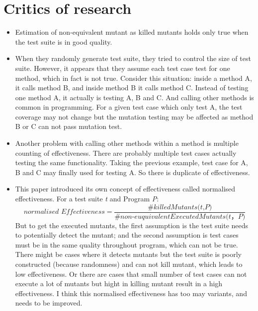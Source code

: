 \documentclass[a4paper]{article}
\begin{document}
\section{Critics of research}
\begin{itemize}
	\item Estimation of non-equivalent mutant as killed mutants holds only true when the test suite is in good quality.
	
	\item When they randomly generate test suite, they tried to control the size of test suite. However, it appears that they assume each test case test for one method, which in fact is not true. Consider this situation: inside a method A, it calls method B, and inside method B it calls method C. Instead of testing one method A, it actually is testing A, B and C. And calling other methods is common in programming. For a given test case which only test A, the test coverage may not change but the mutation testing may be affected as method B or C can not pass mutation test.
	
	\item Another problem with calling other methods within a method is multiple counting of effectiveness. There are probably multiple test cases actually testing the same functionality. Taking the previous example, test case for A, B and C may finally used for testing A. So there is duplicate of effectiveness.
	
	\item This paper introduced its own concept of effectiveness called normalised effectiveness. For a test suite \textit{t} and Program \textit{P}:
	\[\textit{normalised Effectiveness} = \frac{\#\textit{killedMutants(t,P)}}{\#\textit{non-euquivalentExecutedMutants(t，P)}}\]
	But to get the executed mutants, the first assumption is the test suite needs to potentially detect the mutant; and the second assumption is test cases must be in the same quality throughout program, which can not be true. There might be cases where it detects mutants but the test suite is poorly constructed (because randomness) and can not kill mutant, which leads to low effectiveness. Or there are cases that small number of test cases can not execute a lot of mutants but hight in killing mutant result in a high effectiveness. I think this normalised effectiveness has too may variants, and needs to be improved.
\end{itemize}
\end{document}
